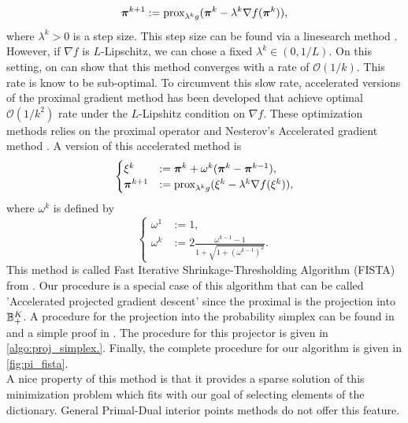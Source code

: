 \begin{equation}
    \boldsymbol \pi^{k+1} := \textnormal{prox}_{\lambda^k g}(\boldsymbol \pi^k-\lambda^k\nabla f(\boldsymbol \pi^k)),
\end{equation}
where $\lambda^k > 0$ is a step size. This step size can be found via a linesearch method \citep{Parikh:2014:PA:2693612.2693613}. However, if $\nabla f$ is $L$-Lipschitz, we can chose a fixed $\lambda^k\in (0,1/L)$. On this setting, on can show that this method converges with a rate of $\mathcal O(1/k)$. This rate is know to be sub-optimal. To circumvent this slow rate, accelerated versions of the proximal gradient method has been developed \citep{RePEc:cor:louvco:2007076}\citep{Beck:2009:FIS:1658360.1658364} that achieve optimal $\mathcal O(1/k^2)$ rate under the $L$-Lipshitz condition on $\nabla f$. These optimization methods relies on the proximal operator and Nesterov's Accelerated gradient method \citep{Nesterov:1983wy}. A version of this accelerated method is
\begin{equation*}
    \begin{cases}
    \xi^k &:= \boldsymbol \pi^k + \omega^k(\boldsymbol \pi^k-\boldsymbol \pi^{k-1}),\\
    \boldsymbol \pi^{k+1} &:= \textnormal{prox}_{\lambda^k g}(\xi^k-\lambda^k\nabla f(\xi^k)),
    \end{cases}
\end{equation*}
where $\omega^k$ is defined by
\begin{equation*}
    \begin{cases}
    \omega^1 &:= 1,   \\
    \omega^k &:= 2\frac{\omega^{k-1}-1}{1+\sqrt{1+(\omega^{k-1})^2}}.
    \end{cases}
\end{equation*}
This method is called Fast Iterative Shrinkage-Thresholding Algorithm (FISTA) from \citep{Beck:2009:FIS:1658360.1658364}. Our procedure is a special case of this algorithm that can be called 'Accelerated projected gradient descent'  since the proximal is the projection into ${\mathbb B}_+^K$. A procedure for the projection into the probability simplex can be found in \citep{Duchi:2008:EPL:1390156.1390191} and a simple proof in \citep{Wang13projectiononto}. The procedure for this projector is given in \cref{algo:proj_simplex.}. Finally, the complete procedure for our algorithm is given in \cref{fig:pi_fista}.\\ 
A nice property of this method is that it provides a sparse solution of this minimization problem which fits with our goal of selecting elements of the dictionary. General Primal-Dual interior points methods do not offer this feature.

